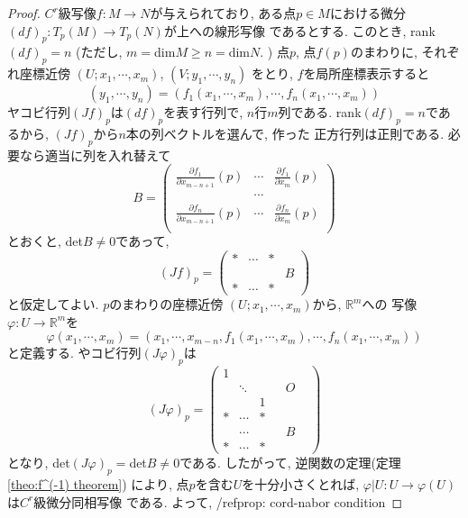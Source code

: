 \documentclass[a4j,12pt]{jarticle}
\theoremstyle{definition}
\begin{document}
\begin{proof}
    $C^r$級写像$f:M\to N$が与えられており, 
    ある点$p\in M$における微分
    $(df)_p:T_p(M)\to T_p(N)$が上への線形写像
    であるとする. このとき, rank$(df)_p=n$
    (ただし, $m=$dim$M\geq n=$dim$N$. )
    点$p$, 点$f(p)$のまわりに, それぞれ座標近傍
    $(U;x_1,\cdots ,x_m)$, $(V;y_1,\cdots ,y_n)$
    をとり, $f$を局所座標表示すると
    $$(y_1, \cdots ,y_n)=(f_1(x_1,\cdots ,x_m), 
    \cdots ,f_n(x_1,\cdots ,x_m))$$
    ヤコビ行列$(Jf)_p$は$(df)_p$を表す行列で, 
    $n$行$m$列である. rank$(df)_p=n$であるから, 
    $(Jf)_p$から$n$本の列ベクトルを選んで, 作った
    正方行列は正則である. 必要なら適当に列を入れ替えて
    $$B=
    \begin{pmatrix}
        \frac{\partial f_1}{\partial x_{m-n+1}}(p) & \cdots & \frac{\partial f_1}{\partial x_m}(p)  \\
        &\cdots& \\
        \frac{\partial f_n}{\partial x_{m-n+1}}(p) & \cdots & \frac{\partial f_n}{\partial x_m}(p)  \\
    \end{pmatrix}
    $$
    とおくと, det$B \neq 0$であって, 
    $$(Jf)_p=
    \left(
        \begin{array}{ccc|c} 
          * & \cdots & *  &  \\
           &  &   & B \\
          * & \cdots & *  & 
        \end{array} 
        \right)
$$
と仮定してよい. $p$のまわりの座標近傍
$(U;x_1,\cdots ,x_m)$から, $\mathbb{R}^m$への
写像$\varphi :U\to \mathbb{R}^m$を
$$\varphi(x_1,\cdots ,x_m)=(x_1, \cdots ,x_{m-n},f_1(x_1,\cdots ,x_m), 
\cdots ,f_n(x_1,\cdots ,x_m))$$
と定義する. やコビ行列$(J\varphi)_p$は
$$(J\varphi)_p=
    \left(
        \begin{array}{ccc|ccc} 
          1 &        &   & & & \\
            & \ddots &   & &O& \\
            &        & 1 & & &  \\ \hline
          * & \cdots & * & & &  \\
            & \cdots &   & &B& \\
          * & \cdots & * & & &
        \end{array} 
        \right)
$$
となり, det$(J\varphi)_p=$det$B\neq 0$である. 
したがって, 逆関数の定理(定理
\ref{theo:f^(-1) theorem})
により, 点$p$を含む$U$を十分小さくとれば, 
$\varphi |U:U\to \varphi(U)$は$C^r$級微分同相写像
である. よって, /ref{prop: cord-nabor condition}

\end{proof}
\end{document}
